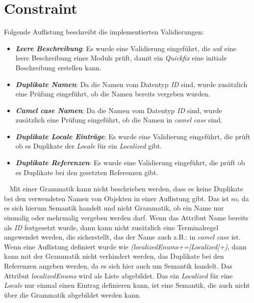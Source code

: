 \section{Constraint}
Folgende Auflistung beschreibt die implementierten Validierungen:
\begin{itemize}
	\item\textbf{\emph{Leere Beschreibung}}: Es wurde eine Validierung eingeführt, die auf eine leere Beschreibung eines Moduls prüft, damit ein \emph{Quickfix} eine initiale Beschreibung erstellen kann.
	
	\item\textbf{\emph{Duplikate Namen}}: Da die Namen vom Datentyp \emph{ID} sind, wurde zusätzlich eine Prüfung eingeführt, ob die Namen bereits vergeben wurden.
	
	\item\textbf{\emph{Camel case Namen}}: Da die Namen vom Datentyp \emph{ID} sind, wurde zusätzlich eine Prüfung eingeführt, ob die Namen in \emph{camel case} sind.
	
	\item\textbf{\emph{Duplikate Locale Einträge}}: Es wurde eine Validierung eingeführt, die prüft ob es Duplikate der \emph{Locale} für ein \emph{Localized} gibt. 
	
	\item\textbf{\emph{Duplikate Referenzen}}: Es wurde eine Validierung eingeführt, die prüft ob es Duplikate bei den gesetzten Referenzen gibt.
\end{itemize}
\ \newline
Mit einer Grammatik kann nicht beschrieben werden, dass es keine Duplikate bei den verwendeten Namen von Objekten in einer Auflistung gibt. Das ist so, da es sich hierum Semantik handelt und nicht Grammatik, ob ein Name nur einmalig oder mehrmalig vergeben werden darf.
\newline
\newline
Wenn das Attribut Name bereits als \emph{ID} festgesetzt wurde, dann kann nicht zusätzlich eine Terminalregel angewendet werden, die sicherstellt, das der Name auch z.B.: in \emph{camel case} ist. 
\newline
\newline
Wenn eine Auflistung definiert wurde wie \emph{(localizedEnums+=[Localized]+)}, dann kann mit der Grammatik nicht verhindert werden, das Duplikate bei den Referenzen angeben werden, da es sich hier auch um Semantik handelt. Das Attribut \emph{localizedEnums} wird als Liste abgebildet.
\newline
\newline
Das ein \emph{Localized} für eine \emph{Locale} nur einmal einen Eintrag definieren kann, ist eine Semantik, die auch nicht über die Grammatik abgebildet werden kann.